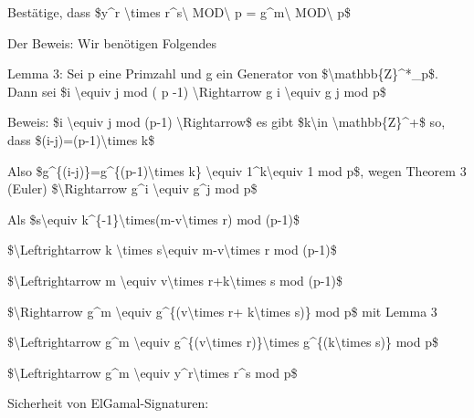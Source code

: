 \documentclass[a4paper]{article}
\begin{document}
\begin{multicols}{3}
\begin{itemize*}
            \begin{itemize*}
                  \item Bestätige, dass \$y\^{}r \textbackslash times r\^{}s\textbackslash{} MOD\textbackslash{} p = g\^{}m\textbackslash{} MOD\textbackslash{} p\$
                  \item Der Beweis: Wir benötigen Folgendes
                  \begin{itemize*} \item Lemma 3: Sei p eine Primzahl und g ein Generator von \$\textbackslash mathbb\{Z\}\^{}*\_p\$. Dann sei \$i \textbackslash equiv j mod ( p -1) \textbackslash Rightarrow g i \textbackslash equiv g j mod p\$ \item Beweis: \$i \textbackslash equiv j mod (p-1) \textbackslash Rightarrow\$ es gibt \$k\textbackslash in \textbackslash mathbb\{Z\}\^{}+\$ so, dass \$(i-j)=(p-1)\textbackslash times k\$ \item Also \$g\^{}\{(i-j)\}=g\^{}\{(p-1)\textbackslash times k\} \textbackslash equiv 1\^{}k\textbackslash equiv 1 mod p\$, wegen Theorem 3 (Euler) \$\textbackslash Rightarrow g\^{}i \textbackslash equiv g\^{}j mod p\$ \end{itemize*}
                  \item Als \$s\textbackslash equiv k\^{}\{-1\}\textbackslash times(m-v\textbackslash times r) mod (p-1)\$
                  \begin{itemize*} \item \$\textbackslash Leftrightarrow k \textbackslash times s\textbackslash equiv m-v\textbackslash times r mod (p-1)\$ \item \$\textbackslash Leftrightarrow m \textbackslash equiv v\textbackslash times r+k\textbackslash times s mod (p-1)\$ \item \$\textbackslash Rightarrow g\^{}m \textbackslash equiv g\^{}\{(v\textbackslash times r+ k\textbackslash times s)\} mod p\$ mit Lemma 3 \item \$\textbackslash Leftrightarrow g\^{}m \textbackslash equiv g\^{}\{(v\textbackslash times r)\}\textbackslash times g\^{}\{(k\textbackslash times s)\} mod p\$ \item \$\textbackslash Leftrightarrow g\^{}m \textbackslash equiv y\^{}r\textbackslash times r\^{}s mod p\$ \end{itemize*}
            \end{itemize*}
            \item
            Sicherheit von ElGamal-Signaturen:


\end{itemize*}
\end{multicols}
\end{document}
